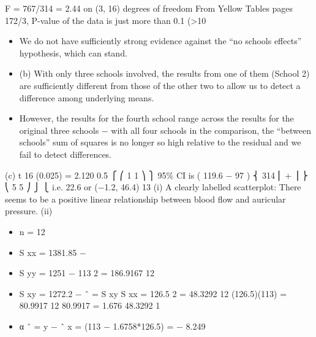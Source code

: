 \documentclass[a4paper,12pt]{article}
\begin{document}
F = 767/314 = 2.44 on (3, 16) degrees of freedom
From Yellow Tables pages 172/3, P-value of the data is just more than
0.1 (>10%
\begin{itemize}
    \item We do not have sufficiently strong evidence against the “no schools effects” hypothesis, which can stand.
\item (b) With only three schools involved, the results from one of them (School 2) are sufficiently different from those of the other two to allow us to detect a difference among underlying means.
\item However, the results for the fourth school range across the results for the original three schools
− with all four schools in the comparison, the “between schools” sum of squares is no longer so high relative to the residual and we fail to detect differences.
\end{itemize}

(c) t 16 (0.025) = 2.120
0.5
⎧
⎛ 1 1 ⎞ ⎫
95\% CI is ( 119.6 − 97 )  ⎨ 314 ⎜ + ⎟ ⎬
⎝ 5 5 ⎠ ⎭
⎩
i.e. 22.6  or (−1.2, 46.4)
13
(i)
A clearly labelled scatterplot:
There seems to be a positive linear relationship between blood flow and auricular pressure.
(ii)
\begin{itemize}
\item n = 12
\item S xx = 1381.85 −
\item S yy = 1251 −
113 2
= 186.9167
12
\item S xy = 1272.2 −
\beta ˆ =
S xy
S xx
=
126.5 2
= 48.3292
12
(126.5)(113)
= 80.9917
12
80.9917
= 1.676
48.3292
1
\item α ˆ = y − \beta ˆ x = (113 − 1.6758*126.5) = − 8.249
\end{itemize}
\end{document}
